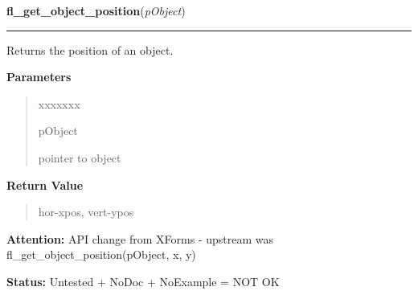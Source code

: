 \hspace{.8\funcindent}\begin{boxedminipage}{\funcwidth}

    \raggedright \textbf{fl\_get\_object\_position}(\textit{pObject})

    \vspace{-1.5ex}

    \rule{\textwidth}{0.5\fboxrule}
\setlength{\parskip}{2ex}
    Returns the position of an object.

\setlength{\parskip}{1ex}
      \textbf{Parameters}
      \vspace{-1ex}

      \begin{quote}
        \begin{Ventry}{xxxxxxx}

          \item[pObject]

          pointer to object

        \end{Ventry}

      \end{quote}

      \textbf{Return Value}
    \vspace{-1ex}

      \begin{quote}
      hor-xpos, vert-ypos

      \end{quote}

\textbf{Attention:} API change from XForms - upstream was fl\_get\_object\_position(pObject, x,
y)



\textbf{Status:} Untested + NoDoc + NoExample = NOT OK



    \end{boxedminipage}

    \label{xformslib:library:fl_get_object_bbox}

    \vspace{0.5ex}

